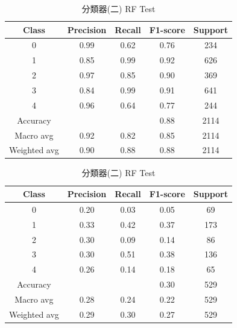 \begin{enumerate}
\begin{enumerate}
                \begin{table}[H]
                \centering
                \scriptsize
                \begin{minipage}{0.48\textwidth}
                \centering
                \begin{tabular}{c|cccc}
                \hline
                Class & Precision & Recall & F1-score & Support \\
                \hline
                0 & 0.99 & 0.62 & 0.76 & 234 \\
                1 & 0.85 & 0.99 & 0.92 & 626 \\
                2 & 0.97 & 0.85 & 0.90 & 369 \\
                3 & 0.84 & 0.99 & 0.91 & 641 \\
                4 & 0.96 & 0.64 & 0.77 & 244 \\
                \hline
                Accuracy &       &       & 0.88 & 2114 \\
                Macro avg & 0.92 & 0.82 & 0.85 & 2114 \\
                Weighted avg & 0.90 & 0.88 & 0.88 & 2114 \\
                \hline
                \end{tabular}
                \caption{分類器(二) RF Train}
                \label{tab:classifier_2_report_train_logreg_rf_non_filtered}
                \end{minipage}%
                \hfill
                \begin{minipage}{0.48\textwidth}
                \centering
                \begin{tabular}{c|cccc}
                \hline
                Class & Precision & Recall & F1-score & Support \\
                \hline
                0 & 0.20 & 0.03 & 0.05 & 69 \\
                1 & 0.33 & 0.42 & 0.37 & 173 \\
                2 & 0.30 & 0.09 & 0.14 & 86 \\
                3 & 0.30 & 0.51 & 0.38 & 136 \\
                4 & 0.26 & 0.14 & 0.18 & 65 \\
                \hline
                Accuracy &       &       & 0.30 & 529 \\
                Macro avg & 0.28 & 0.24 & 0.22 & 529 \\
                Weighted avg & 0.29 & 0.30 & 0.27 & 529 \\
                \hline
                \end{tabular}
                \caption{分類器(二) RF Test}
                \label{tab:classifier_2_report_test_logreg_rf_non_filtered}
                \end{minipage}
                \end{table}



\end{enumerate}
\end{enumerate}
